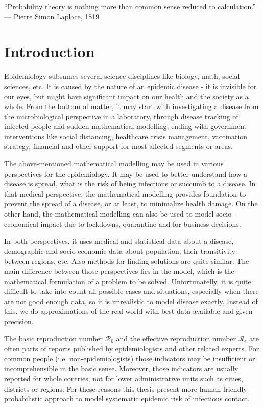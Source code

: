 \documentclass[
  digital, %
  table,   %
  twoside, %
  12pt,
  lof,     %
  lot,     %
]{fithesis3}
\begin{document}
“Probability theory is nothing more than common sense reduced to calculation.” — Pierre Simon Laplace, 1819

\chapter*{Introduction}

Epidemiology subsumes several science disciplines like biology, 
math, social sciences, etc. 
It is caused by the nature of an epidemic disease - it is 
invisible for our eyes, but might have significant impact on 
our health and the society as a whole.
From the bottom of matter, it may start with investigating a 
disease from the microbiological perspective in a laboratory, 
through disease tracking of infected people and sudden mathematical
modelling, ending  with government interventions like social distancing, 
healthcare crisis management, vaccination strategy, financial and other 
support for most affected segments or areas.

The above-mentioned mathematical modelling may be used in 
various perspectives for the epidemiology. It may be used to
better understand how a disease is spread, what is the risk 
of being infectious or succumb to a disease. In that medical 
perspective, the mathematical modelling provides foundation to 
prevent the spread of a disease, or at least, to minimalize health damage.
On the other hand, the mathematical modelling can also be used to model
socio-economical impact due to lockdowns, quarantine and for business decisions.

In both perspectives, it uses medical and statistical data about a 
disease, demographic and socio-economic data about population, 
their transitivity between regions, etc. 
Also methods for finding solutions are quite similar. 
The main difference between those perspectives lies in the model, 
which is the mathematical formulation of a problem to be solved. 
Unfortunatelly, it is quite difficult to take into count all 
possible cases and situations, especially when there are not 
good enough data, so it is unrealistic to model disease exactly. 
Instead of this, we do approximations of the real world 
with best data available and given precision.

The basic reproduction number $\mathcal{R}_0$ and the effective 
reproduction number $\mathcal{R}_e$ are often parts of reports 
published by epidemiologists and other related experts.
For common people (i.e. non-epidemiologists) those indicators 
may be insufficient or incomprehensible in the basic sense.
Moreover, those indicators are usually reported for whole contries, 
not for lower administrative units such as cities, districts or regions. 
For these reasons this thesis present more human friendly 
probabilistic approach to model systematic epidemic risk of
infectious contact.
\end{document}
